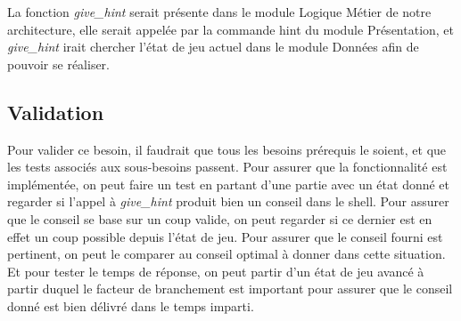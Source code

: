 \documentclass[11pt]{article}
\begin{document}
\normalsize
La fonction \textit{give\_hint} serait présente dans le module Logique Métier de notre architecture, elle serait appelée par la commande hint du module Présentation, et \textit{give\_hint} irait chercher l’état de jeu actuel dans le module Données afin de pouvoir se réaliser.


\subsection{Validation}

\normalsize
Pour valider ce besoin, il faudrait que tous les besoins prérequis le soient, et que les tests associés aux sous-besoins passent. Pour assurer que la fonctionnalité est implémentée, on peut faire un test en partant d’une partie avec un état donné et regarder si l’appel à \textit{give\_hint} produit bien un conseil dans le shell.
Pour assurer que le conseil se base sur un coup valide, on peut regarder si ce dernier est en effet un coup possible depuis l’état de jeu. Pour assurer que le conseil fourni est pertinent, on peut le comparer au conseil optimal à donner dans cette situation. Et pour tester le temps de réponse, on peut partir d’un état de jeu avancé à partir duquel le facteur de branchement est important pour assurer que le conseil donné est bien délivré dans le temps imparti.








\nocite{*}


\end{document}
